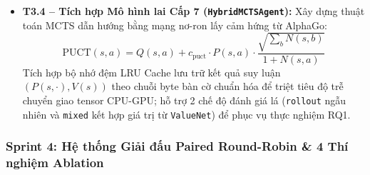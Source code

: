 \documentclass[a4paper,12pt]{report}
\begin{document}
\begin{itemize}
    \item \textbf{T3.4 -- Tích hợp Mô hình lai Cấp 7 (\texttt{HybridMCTSAgent}):}
    Xây dựng thuật toán MCTS dẫn hướng bằng mạng nơ-ron lấy cảm hứng từ AlphaGo:
    \begin{equation}
    \text{PUCT}(s, a) = Q(s, a) + c_{\text{puct}} \cdot P(s, a) \cdot \frac{\sqrt{\sum_{b} N(s, b)}}{1 + N(s, a)}
    \end{equation}
    Tích hợp bộ nhớ đệm LRU Cache lưu trữ kết quả suy luận $(P(s, \cdot), V(s))$ theo chuỗi byte bàn cờ chuẩn hóa để triệt tiêu độ trễ chuyển giao tensor CPU-GPU; hỗ trợ 2 chế độ đánh giá lá (\texttt{rollout} ngẫu nhiên và \texttt{mixed} kết hợp giá trị từ \texttt{ValueNet}) để phục vụ thực nghiệm RQ1.
\end{itemize}

\subsubsection{Sprint 4: Hệ thống Giải đấu Paired Round-Robin \& 4 Thí nghiệm Ablation}
\end{document}

